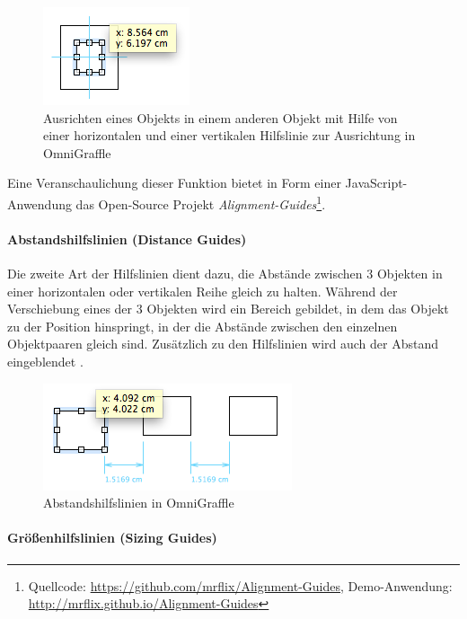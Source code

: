 \begin{figure}[hbt]
    \centering
    \includegraphics{resources/omnigraffle-alignment-guides-centering.png}
    \caption{Ausrichten eines Objekts in einem anderen Objekt mit Hilfe von einer horizontalen und einer vertikalen Hilfslinie zur Ausrichtung in OmniGraffle}
    \label{fig:omnigraffle-alignment-guides-centering}
\end{figure}

Eine Veranschaulichung dieser Funktion bietet in Form einer JavaScript-Anwendung das Open-Source Projekt \textit{Alignment-Guides}\footnote{Quellcode: \url{https://github.com/mrflix/Alignment-Guides}, Demo-Anwendung: \url{http://mrflix.github.io/Alignment-Guides}}.

\paragraph{Abstandshilfslinien (Distance Guides)}

Die zweite Art der Hilfslinien dient dazu, die Abstände zwischen 3 Objekten in einer horizontalen oder vertikalen Reihe gleich zu halten. Während der Verschiebung eines der 3 Objekten wird ein Bereich gebildet, in dem das Objekt zu der Position hinspringt, in der die Abstände zwischen den einzelnen Objektpaaren gleich sind. Zusätzlich zu den Hilfslinien wird auch der Abstand eingeblendet \cite{11Keynote, Olsen10OmniGraffle}.

\begin{figure}[hbt]
    \centering
    \includegraphics{resources/omnigraffle-distance-guides.png}
    \caption{Abstandshilfslinien in OmniGraffle}
    \label{fig:omnigraffle-distance-guides}
\end{figure}

\paragraph{Größenhilfslinien (Sizing Guides)}

